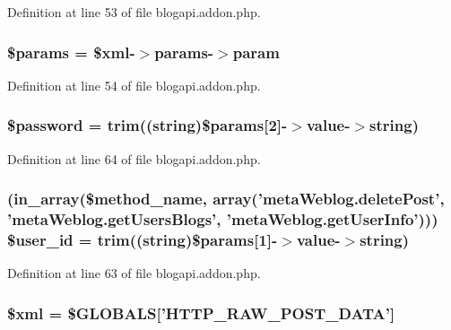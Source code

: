 Definition at line 53 of file blogapi.\-addon.\-php.

\hypertarget{blogapi_8addon_8php_afe68e6fbe7acfbffc0af0c84a1996466}{
\subsubsection[{\$params}]{\setlength{\rightskip}{0pt plus 5cm}\$params = \$xml-\/$>$params-\/$>$param}}\label{blogapi_8addon_8php_afe68e6fbe7acfbffc0af0c84a1996466}


Definition at line 54 of file blogapi.\-addon.\-php.

\hypertarget{blogapi_8addon_8php_a607686ef9f99ea7c42f4f3dd3dbb2b0d}{
\subsubsection[{\$password}]{\setlength{\rightskip}{0pt plus 5cm}\$password = trim((string)\$params\mbox{[}2\mbox{]}-\/$>$value-\/$>$string)}}\label{blogapi_8addon_8php_a607686ef9f99ea7c42f4f3dd3dbb2b0d}


Definition at line 64 of file blogapi.\-addon.\-php.

\hypertarget{blogapi_8addon_8php_a6d0a036129b3030ce289a026c5e1eff2}{
\subsubsection[{\$user\-\_\-id}]{ (in\-\_\-array(\$method\-\_\-name, array('meta\-Weblog.\-delete\-Post', 'meta\-Weblog.\-get\-Users\-Blogs', 'meta\-Weblog.\-get\-User\-Info'))) \${\bf user\-\_\-id} = trim((string)\$params\mbox{[}1\mbox{]}-\/$>$value-\/$>$string)}}\label{blogapi_8addon_8php_a6d0a036129b3030ce289a026c5e1eff2}


Definition at line 63 of file blogapi.\-addon.\-php.

\hypertarget{blogapi_8addon_8php_aa108d9d91e700ac530401dd363b0723b}{
\subsubsection[{\$xml}]{\setlength{\rightskip}{0pt plus 5cm}\$xml = \$G\-L\-O\-B\-A\-L\-S\mbox{[}'H\-T\-T\-P\-\_\-\-R\-A\-W\-\_\-\-P\-O\-S\-T\-\_\-\-D\-A\-T\-A'\mbox{]}}}\label{blogapi_8addon_8php_aa108d9d91e700ac530401dd363b0723b}


